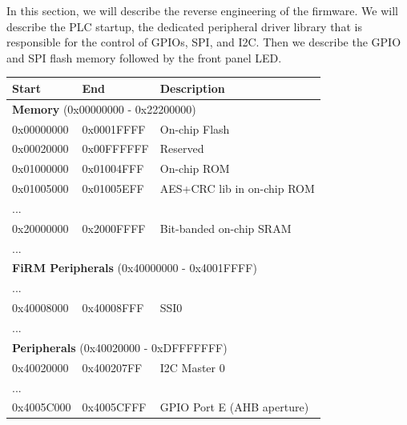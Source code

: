 In this section, we will describe the reverse engineering of the firmware. We will describe the PLC startup, the dedicated peripheral driver library that is responsible for the control of GPIOs, SPI, and I2C. Then we describe the GPIO and SPI flash memory followed by the front panel LED.


\begin{center}
	\begin{table}
		\small
		\begin{tabular}{p{1.6cm}  p{1.6cm}  p{4cm}} 
			\hline
			Start & End & Description \\ 
			\hline
			\multicolumn{3}{l}{\textbf{Memory} (0x00000000 - 0x22200000)}  \\
			\hline
			0x00000000 & 0x0001FFFF & On-chip Flash \\ 
			\hline
			0x00020000 & 0x00FFFFFF & Reserved \\
			\hline
			0x01000000 & 0x01004FFF & On-chip ROM  \\
			\hline
			0x01005000 & 0x01005EFF & AES+CRC lib in on-chip ROM   \\
			\hline
			... & & \\
			\hline
			0x20000000 & 0x2000FFFF & Bit-banded on-chip SRAM \\
			\hline
			... & & \\
			\hline
			\multicolumn{3}{l}{\textbf{FiRM Peripherals} (0x40000000 - 0x4001FFFF)}  \\
			\hline
			... & & \\
			\hline
			0x40008000 & 0x40008FFF & SSI0 \\
			\hline
			... & & \\
			\hline
			\multicolumn{3}{l}{\textbf{Peripherals} (0x40020000 - 0xDFFFFFFF)}  \\
			\hline
			0x40020000 & 0x400207FF & I2C Master 0 \\
			\hline
			... & & \\
			\hline
			0x4005C000 & 0x4005CFFF & GPIO Port E (AHB aperture) \\

\end{tabular}
\end{table}
\end{center}
